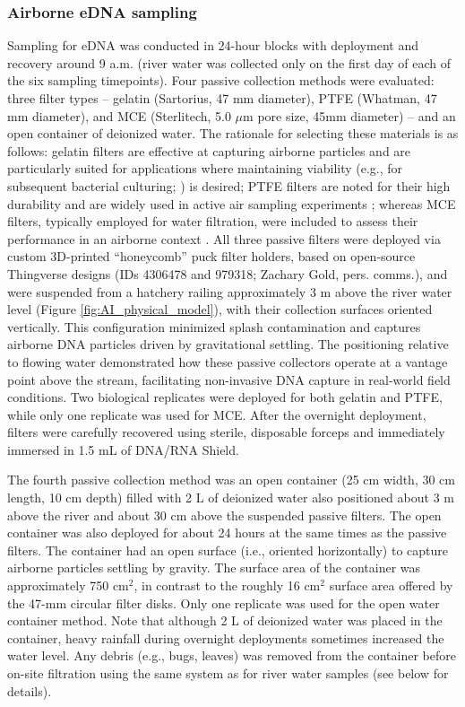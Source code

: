 \documentclass{article}
\begin{document}
\subsubsection{Airborne eDNA sampling}
Sampling for eDNA was conducted in 24-hour blocks with deployment and recovery around 9 a.m. (river water was collected only on the first day of each of the six sampling timepoints). Four passive collection methods were evaluated: three filter types -- gelatin (Sartorius, 47 mm diameter), PTFE (Whatman, 47 mm diameter), and MCE (Sterlitech, 5.0 $\mu$m pore size, 45mm diameter) -- and an open container of deionized water. The rationale for selecting these materials is as follows: gelatin filters are effective at capturing airborne particles and are particularly suited for applications where maintaining viability (e.g., for subsequent bacterial culturing; \cite{wu2010}) is desired; PTFE filters are noted for their high durability and are widely used in active air sampling experiments \cite{harnpicharnchai2023}; whereas MCE filters, typically employed for water filtration, were included to assess their performance in an airborne context \cite{allan2023}. All three passive filters were deployed via custom 3D-printed “honeycomb” puck filter holders, based on open-source Thingverse designs (IDs 4306478 and 979318; Zachary Gold, pers. comms.), and were suspended from a hatchery railing approximately 3 m above the river water level (Figure \ref{fig:AI_physical_model}), with their collection surfaces oriented vertically. This configuration minimized splash contamination and captures airborne DNA particles driven by gravitational settling. The positioning relative to flowing water demonstrated how these passive collectors operate at a vantage point above the stream, facilitating non-invasive DNA capture in real-world field conditions. Two biological replicates were deployed for both gelatin and PTFE, while only one replicate was used for MCE. After the overnight deployment, filters were carefully recovered using sterile, disposable forceps and immediately immersed in 1.5 mL of DNA/RNA Shield.

The fourth passive collection method was an open container (25 cm width, 30 cm length, 10 cm depth) filled with 2 L of deionized water \cite{klepke2022} also positioned about 3 m above the river and about 30 cm above the suspended passive filters. The open container was also deployed for about 24 hours at the same times as the passive filters. The container had an open surface (i.e., oriented horizontally) to capture airborne particles settling by gravity. The surface area of the container was approximately 750 cm$^2$, in contrast to the roughly 16 cm$^2$ surface area offered by the 47-mm circular filter disks. Only one replicate was used for the open water container method. Note that although 2 L of deionized water was placed in the container, heavy rainfall during overnight deployments sometimes increased the water level. Any debris (e.g., bugs, leaves) was removed from the container before on-site filtration using the same system as for river water samples (see below for details).
\end{document}

